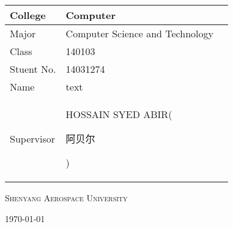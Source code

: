 \documentclass[12pt,a4paper]{article}
\newcommand{\zh}[1]{\begin{CJK}{UTF8}{gbsn}#1\end{CJK}}
\begin{document}
\begin{titlepage}
	\vspace{2cm}
	
	\begin{table}[ht]
	\center
	\begin{tabular}{|M{5cm}|M{9cm}|N}
	\hline
	\huge {College} &  {Computer} &\\[25pt]
	\hline
	\huge{Major} & {Computer Science and Technology}&\\[25pt]
	\hline
	\huge{Class} & {140103}&\\[25pt]
	\hline
	\huge{Stuent No.} & {14031274}&\\[25pt]
	\hline
	\huge{Name} & {text}&\\[25pt]
	\hline
	\huge{Supervisor} & {HOSSAIN SYED ABIR(\zh{阿贝尔})}&\\[25pt]
	\hline
	\end{tabular}
	\end{table}	
	
	
	\vspace{3.5cm}
	{\scshape\large Shenyang Aerospace University \par}
	\vspace{1cm}
	{\large \today\par}
\end{titlepage}	
\end{document}
